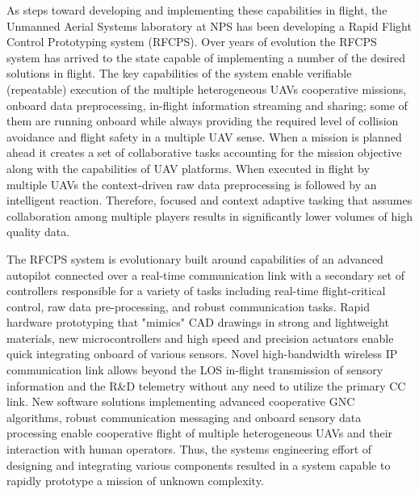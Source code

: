 \documentclass[letterpaper, 10 pt, conference]{ieeeconf}  %
\begin{document}
As steps toward developing and implementing these capabilities in flight, the Unmanned Aerial Systems laboratory at NPS has been developing a Rapid Flight Control Prototyping system (RFCPS). Over years of evolution the RFCPS system has arrived to the state capable of implementing a number of the desired solutions in flight. The key capabilities of the system enable verifiable (repeatable) execution of the multiple heterogeneous UAVs cooperative missions, onboard data preprocessing, in-flight information streaming and sharing; some of them are running onboard while always providing the required level of collision avoidance  and flight safety in a multiple UAV sense. When a mission is planned ahead it creates a set of collaborative tasks accounting for the mission objective along with the capabilities of UAV platforms. When executed in flight by multiple UAVs the context-driven raw data preprocessing is followed by an intelligent reaction. Therefore, focused and context adaptive tasking that assumes collaboration among multiple players results in significantly lower volumes of high quality data.


The RFCPS system is evolutionary built around capabilities of an advanced autopilot connected over a real-time communication link with a secondary set of controllers responsible for a variety of tasks including real-time flight-critical control, raw data pre-processing, and robust communication tasks. Rapid hardware prototyping that "mimics" CAD drawings in strong and lightweight materials, new microcontrollers and high speed and precision actuators enable quick integrating onboard of various sensors. Novel high-bandwidth wireless IP communication link allows beyond the LOS in-flight transmission of sensory information and the R\&D telemetry without any need to utilize the primary CC link. New software solutions implementing advanced cooperative GNC algorithms, robust communication messaging and onboard sensory data processing enable cooperative flight of multiple heterogeneous UAVs and their interaction with human operators. Thus, the systems engineering effort of designing and integrating various components resulted in a system capable to rapidly prototype a mission of unknown complexity.
\end{document}
